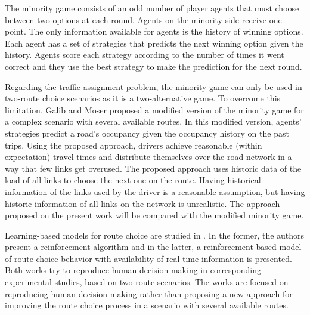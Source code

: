 \documentclass{RITA}
\begin{document}
The minority game consists of an odd number of player agents that must choose between two options at each round. Agents on the minority side receive one point. The only information available for agents is the history of winning options. Each agent has a set of strategies that predicts the next winning option given the history. Agents score each strategy according to the number of times it went correct and they use the best strategy to make the prediction for the next round.

Regarding the traffic assignment problem, the minority game can only be used in two-route choice scenarios as it is a two-alternative game. To overcome this limitation, Galib and Moser \cite{Galib&Moser2011} proposed a modified version of the minority game for a complex scenario with several available routes. In this modified version, agents' strategies predict a road's occupancy given the occupancy history on the past trips. Using the proposed approach, drivers achieve reasonable (within expectation) travel times and distribute themselves over the road network in a way that few links get overused. The proposed approach uses historic data of the load of all links to choose the next one on the route. Having historical information of the links used by the driver is a reasonable assumption, but having historic information of all links on the network is unrealistic. The approach proposed on the present work will be compared with the modified minority game. 


Learning-based models for route choice are studied in \cite{Chmura&Pitz2007,Ben-Elia&Shiftan2010}. In the former, the authors present a reinforcement algorithm and in the latter, a reinforcement-based model of route-choice behavior with availability of real-time information is presented. Both works try to reproduce human decision-making in corresponding experimental studies, based on two-route scenarios. The works are focused on reproducing human decision-making rather than proposing a new approach for improving the route choice process in a scenario with several available routes.
\end{document}
